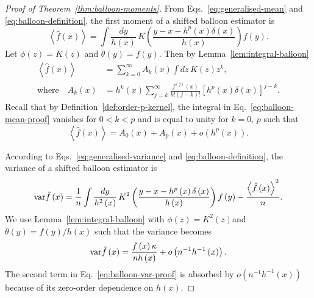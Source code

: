 \begin{proof}[Proof of Theorem~\ref{thm:balloon-moments}]
From Eqs.~\eqref{eq:generalised-mean} and \eqref{eq:balloon-definition}, the first moment of a shifted balloon estimator is
\[
\left\langle \hat{f}\left(x\right)\right\rangle =\int\frac{dy}{h\left(x\right)}\,K\left(\frac{y-x-h^{p}\left(x\right)\delta\left(x\right)}{h\left(x\right)}\right)f\left(y\right).
\]
Let $\phi\left(z\right)=K\left(z\right)$ and $\theta\left(y\right)=f\left(y\right)$. Then by Lemma~\ref{lem:integral-balloon}
\begin{align}
\left\langle \hat{f}\left(x\right)\right\rangle  & =\sum_{k=0}^{\infty}A_{k}\left(x\right)\int dz\,K\left(z\right)z^{k},\label{eq:balloon-mean-proof}\\
\text{where}\quad A_{k}\left(x\right) & =h^{k}\left(x\right)\sum_{j=k}^{\infty}\frac{f^{\left(j\right)}\left(x\right)}{k!\left(j-k\right)!}\left[h^{p}\left(x\right)\delta\left(x\right)\right]^{j-k}.\nonumber 
\end{align}
Recall that by Definition~\ref{def:order-p-kernel}, the integral in Eq.~\eqref{eq:balloon-mean-proof} vanishes for $0<k<p$ and is equal to unity for $k=0,\,p$ such that
\[
\left\langle \hat{f}\left(x\right)\right\rangle =A_{0}\left(x\right)+A_{p}\left(x\right)+o\left(h^{p}\left(x\right)\right).
\]


According to Eqs.~\eqref{eq:generalised-variance} and \eqref{eq:balloon-definition}, the variance of a shifted balloon estimator is
\begin{equation}
\mathrm{var}\hat{f}\left(x\right)=\frac{1}{n}\int\frac{dy}{h^{2}\left(x\right)}\,K^{2}\left(\frac{y-x-h^{p}\left(x\right)\delta\left(x\right)}{h\left(x\right)}\right)f\left(y\right)-\frac{\left\langle \hat{f}\left(x\right)\right\rangle ^{2}}{n}.\label{eq:balloon-var-proof}
\end{equation}
We use Lemma~\ref{lem:integral-balloon} with $\phi\left(z\right)=K^{2}\left(z\right)$and $\theta\left(y\right)=f\left(y\right)/h\left(x\right)$ such that the variance becomes
\[
\mathrm{var}\hat{f}\left(x\right)=\frac{f\left(x\right)\kappa}{nh\left(x\right)}+o\left(n^{-1}h^{-1}\left(x\right)\right).
\]
The second term in Eq.~\eqref{eq:balloon-var-proof} is absorbed by $o\left(n^{-1}h^{-1}\left(x\right)\right)$ because of its zero-order dependence on $h$$\left(x\right)$.\end{proof}
